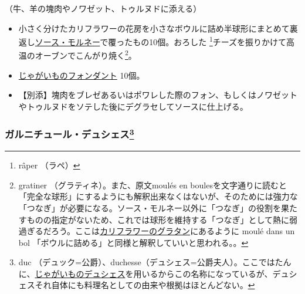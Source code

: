 \begin{recette}


（牛、羊の塊肉やノワゼット、トゥルヌドに添える）

\begin{itemize}
\item
  小さく分けたカリフラワーの花房を小さなボウルに詰め半球形にまとめて裏返し\protect\hyperlink{sauce-mornay}{ソース・モルネー}で覆ったもの10個。おろした
  \footnote{râper （ラペ）}チーズを振りかけて高温のオーブンでこんがり焼く\footnote{gratiner
    （グラティネ）。また、原文moulés en
    boulesを文字通りに読むと「完全な球形」にするようにも解釈出来なくはないが、そのためには強力な「つなぎ」が必要になる。ソース・モルネー以外に「つなぎ」の役割を果たすものの指定がないため、これでは球形を維持する「つなぎ」として熱に弱過ぎるだろう。ここは\protect\hyperlink{chou-fleur-au-gratin}{カリフラワーのグラタン}にあるように
    moulé dans un bol
    「ボウルに詰める」と同様と解釈していいと思われる。。}。
\item
  \protect\hyperlink{pommes-de-terre-fondantes}{じゃがいものフォンダント}
  10個。
\item
  【別添】塊肉をブレゼあるいはポワレした際のフォン、もしくはノワゼットやトゥルヌドをソテした後にデグラセしてソースに仕上げる。
\end{itemize}

\atoaki{}

\hypertarget{garniture-a-la-duchesse}{%
\subsubsection[ガルニチュール・デュシェス]{\texorpdfstring{ガルニチュール・デュシェス\footnote{duc
  （デュック=公爵）、duchesse（デュシェス=公爵夫人）。ここではたんに、\protect\hyperlink{pommes-de-terre-duchesse}{じゃがいものデュシェス}を用いるからこの名称になっているが、デュシェスそれ自体にも料理名としての由来や根拠はほとんどない。}}{ガルニチュール・デュシェス}}\label{garniture-a-la-duchesse}}




\end{recette}
